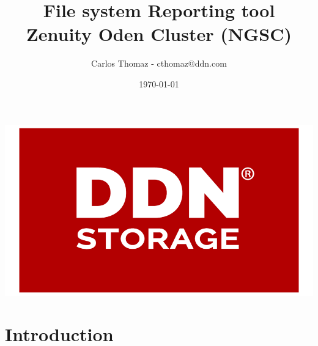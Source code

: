 \documentclass{article}
\title{%
    File system Reporting tool \\
    \large Zenuity Oden Cluster (NGSC)}
\author{Carlos Thomaz - cthomaz@ddn.com}
\date{\today}
\begin{document}
\maketitle


\begin{center}
    \includegraphics[scale=0.14]{logo.png}\\[1cm] 
\end{center}

\newpage

\begin{versionhistory}

\end{versionhistory}
\newpage


\section{Introduction}
\end{document}
